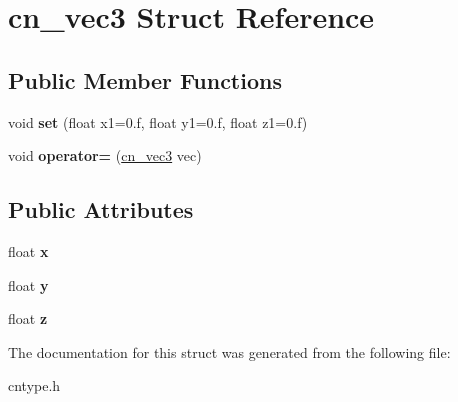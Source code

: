 \hypertarget{structcn__vec3}{\section{cn\-\_\-vec3 Struct Reference}
\label{structcn__vec3}
}
\subsection*{Public Member Functions}
\begin{DoxyCompactItemize}
\item 
\hypertarget{structcn__vec3_a0da42f9255759ed2d085d52e962ca192}{void {\bfseries set} (float x1=0.f, float y1=0.f, float z1=0.f)}\label{structcn__vec3_a0da42f9255759ed2d085d52e962ca192}

\item 
\hypertarget{structcn__vec3_a50a584d9b1393c746e9c554ed3e8333a}{void {\bfseries operator=} (\hyperlink{structcn__vec3}{cn\-\_\-vec3} vec)}\label{structcn__vec3_a50a584d9b1393c746e9c554ed3e8333a}

\end{DoxyCompactItemize}
\subsection*{Public Attributes}
\begin{DoxyCompactItemize}
\item 
\hypertarget{structcn__vec3_aaead29da873346775f81c3cc9ec46657}{float {\bfseries x}}\label{structcn__vec3_aaead29da873346775f81c3cc9ec46657}

\item 
\hypertarget{structcn__vec3_a6faa1400ed8b31756f8013fdb35c238c}{float {\bfseries y}}\label{structcn__vec3_a6faa1400ed8b31756f8013fdb35c238c}

\item 
\hypertarget{structcn__vec3_ae4d91cc173348fb83029575db29180f9}{float {\bfseries z}}\label{structcn__vec3_ae4d91cc173348fb83029575db29180f9}

\end{DoxyCompactItemize}


The documentation for this struct was generated from the following file\-:\begin{DoxyCompactItemize}
\item 
cntype.\-h\end{DoxyCompactItemize}
